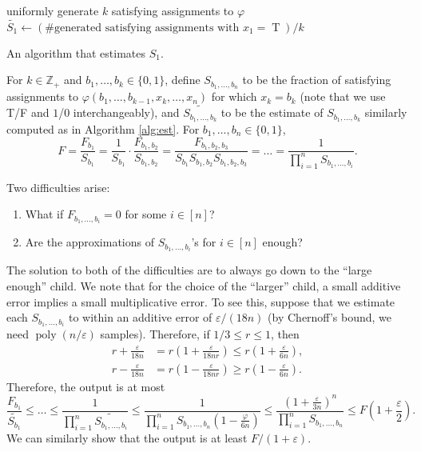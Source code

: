 \documentclass[letterpaper, reqno,11pt]{article}
\newcommand{\ZZ}{\mathbb{Z}}
\DeclareMathOperator{\T}{T}
\DeclareMathOperator{\poly}{poly}
\begin{document}
\begin{algorithm}
  uniformly generate $k$ satisfying assignments to $\varphi$ \\
  $\widetilde{S_1} \leftarrow (\text{\# generated satisfying assignments with $x_1 = \T$})/k$
  \caption{An algorithm that estimates $S_1$.}
  \label{alg:est}
\end{algorithm}

For $k \in \ZZ_+$ and $b_1, \ldots, b_k \in \{ 0, 1 \}$, define $S_{b_1, \ldots, b_n}$ to be the fraction of satisfying assignments to $\varphi(b_1, \ldots, b_{k - 1}, x_k, \ldots, x_n)$ for which $x_k = b_k$ (note that we use T/F and $1$/$0$ interchangeably), and $\widetilde{S_{b_1, \ldots, b_k}}$ to be the estimate of $S_{b_1, \ldots, b_k}$ similarly computed as in Algorithm \ref{alg:est}. For $b_1, \ldots, b_n \in \{ 0, 1 \}$,
$$ F = \frac{F_{b_1}}{S_{b_1}} = \frac{1}{S_{b_1}} \cdot \frac{F_{b_1, b_2}}{S_{b_1, b_2}} = \frac{F_{b_1, b_2, b_3}}{S_{b_1} S_{b_1, b_2} S_{b_1, b_2, b_3}} = \ldots = \frac{1}{\prod_{i = 1}^n S_{b_1, \ldots, b_i}}. $$

Two difficulties arise:
\begin{enumerate}[label=(\roman*), itemsep=0pt]
  \item What if $F_{b_1, \ldots, b_i} = 0$ for some $i \in [n]$?
  \item Are the approximations of $S_{b_1, \ldots, b_i}$'s for $i \in [n]$ enough?
\end{enumerate}
The solution to both of the difficulties are to always go down to the ``large enough'' child. We note that for the choice of the ``larger'' child, a small additive error implies a small multiplicative error. To see this, suppose that we estimate each $S_{b_1, \ldots, b_i}$ to within an additive error of $\varepsilon/(18n)$ (by Chernoff's bound, we need $\poly(n/\varepsilon)$ samples). Therefore, if $1/3 \leq r \leq 1$, then
\begin{align*}
  r + \frac{\varepsilon}{18n} &= r\left(1 + \frac{\varepsilon}{18nr}\right) \leq r\left(1 + \frac{\varepsilon}{6n}\right), \\
  r - \frac{\varepsilon}{18n} &= r\left(1 - \frac{\varepsilon}{18nr}\right) \geq r\left(1 - \frac{\varepsilon}{6n}\right).
\end{align*}
Therefore, the output is at most
$$ \frac{F_{b_1}}{\widetilde{S_{b_1}}} \leq \ldots \leq \frac{1}{\prod_{i = 1}^n \widetilde{S_{b_1, \ldots, b_i}}} \leq \frac{1}{\prod_{i = 1}^n S_{b_1, \ldots, b_n} \left(1 - \frac{\varphi}{6n}\right)} \leq \frac{\left(1 + \frac{\varepsilon}{3n}\right)^n}{\prod_{i = 1}^n S_{b_1, \ldots, b_n}} \leq F\left(1 + \frac{\varepsilon}{2}\right). $$
We can similarly show that the output is at least $F/(1 + \varepsilon)$.
\end{document}
